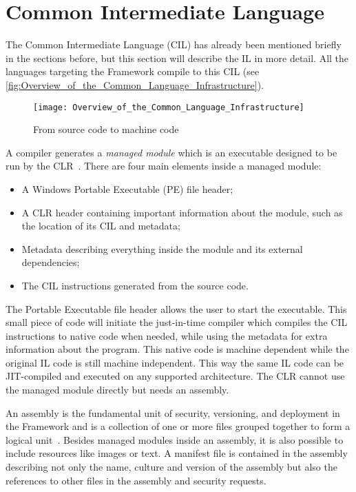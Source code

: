 \section{Common Intermediate Language}
\label{sec:TheIntermediateLanguage}
The Common Intermediate Language (CIL) has already been mentioned briefly in the sections before, but this section will describe the IL in more detail.
All the languages targeting the \dotNET Framework compile to this CIL (see \autoref{fig:Overview_of_the_Common_Language_Infrastructure}).

\begin{figure}
  \centering
  \texttt{[image: Overview\_of\_the\_Common\_Language\_Infrastructure]}
  \caption{From source code to machine code}
  \label{fig:Overview_of_the_Common_Language_Infrastructure}
\end{figure}

A \dotNET compiler generates a \emph{managed module} which is an executable designed to be run by the CLR~\cite{Prosise2002}.
There are four main elements inside a managed module:

\begin{itemize}[noitemsep]
  \item A Windows Portable Executable (PE) file header;
  \item A CLR header containing important information about the module, such as the location of its CIL and metadata;
  \item Metadata describing everything inside the module and its external dependencies;
  \item The CIL instructions generated from the source code.
\end{itemize}

The Portable Executable file header allows the user to start the executable.
This small piece of code will initiate the just-in-time compiler which compiles the CIL instructions to native code when needed, while using the metadata for extra information about the program.
This native code is machine dependent while the original IL code is still machine independent.
This way the same IL code can be JIT-compiled and executed on any supported architecture.
The CLR cannot use the managed module directly but needs an assembly. 

An assembly is the fundamental unit of security, versioning, and deployment in the \dotNET Framework and is a collection of one or more files grouped together to form a logical unit~\cite{Prosise2002}.
Besides managed modules inside an assembly, it is also possible to include resources like images or text.
A manifest file is contained in the assembly describing not only the name, culture and version of the assembly but also the references to other files in the assembly and security requests.

